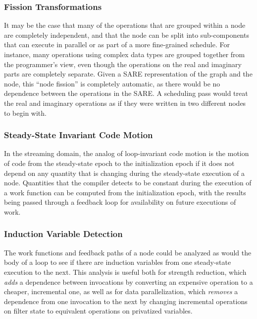 \subsubsection{Fission Transformations}

It may be the case that many of the operations that are grouped within
a node are completely independent, and that the node can be split into
sub-components that can execute in parallel or as part of a more
fine-grained schedule.  For instance, many operations using complex
data types are grouped together from the programmer's view, even
though the operations on the real and imaginary parts are completely
separate.  Given a SARE representation of the graph and the node, this
``node fission'' is completely automatic, as there would be no
dependence between the operations in the SARE.  A scheduling pass
would treat the real and imaginary operations as if they were written
in two different nodes to begin with.

\subsubsection{Steady-State Invariant Code Motion}

In the streaming domain, the analog of loop-invariant code motion is
the motion of code from the steady-state epoch to the initialization
epoch if it does not depend on any quantity that is changing during
the steady-state execution of a node.  Quantities that the compiler
detects to be constant during the execution of a work function can be
computed from the initialization epoch, with the results being passed
through a feedback loop for availability on future executions of work.

\subsubsection{Induction Variable Detection}

The work functions and feedback paths of a node could be analyzed as
would the body of a loop to see if there are induction variables from
one steady-state execution to the next.  This analysis is useful both
for strength reduction, which {\it adds} a dependence between
invocations by converting an expensive operation to a cheaper,
incremental one, as well as for data parallelization, which {\it
removes} a dependence from one invocation to the next by changing
incremental operations on filter state to equivalent operations on
privatized variables.

